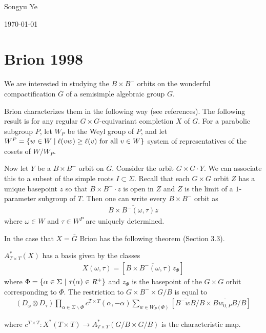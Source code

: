 \documentclass[12pt]{article}
\begin{document}
Songyu Ye

\today

\hfill

\section{Brion 1998}
We are interested in studying the $B\times B^-$ orbits on the wonderful compactification $\overline G$
of a semisimple algebraic group $G$.

\hfill

Brion characterizes them in the following way (see references). The following result is for
any regular $G\times G$-equivariant completion $X$ of $G$. For a parabolic subgroup $P$,
let $W_P$ be the Weyl group of $P$, and let 
$W^P = \{w\in W\mid \ell(vw)\geq \ell(v) \text{ for all } v\in W\}$ system of representatives 
of the cosets of $W/W_P$.

\hfill 

Now let $Y$ be a $B\times B^-$ orbit on $\overline G$. Consider the orbit $G\times G\cdot Y$. We can associate 
this to a subset of the simple roots $I\subset \Sigma$. Recall that each $G\times G$ orbit $Z$ has 
a unique basepoint $z$ so that $B\times B^-\cdot z$ is open in $Z$ and $Z$ is the limit of a $1$-parameter 
subgroup of $T$. Then one can write every $B\times B^-$ orbit as \begin{align*}
    \overline{B\times B^-(\omega,\tau)z}
\end{align*} where $\omega\in W$ and $\tau \in W^P$ are uniquely determined.

\hfill

In the case that $X = \bar G$ Brion has the following theorem (Section 3.3). 

\begin{theorem}
    $A_{T\times T}^*(X)$ has a basis given by the classes \begin{align*}
        X(\omega,\tau) = [\overline{B\times B^-(\omega,\tau)z_\Phi}]
    \end{align*} where $\Phi = \{\alpha\in\Sigma \ \vert \  \tau(\alpha)\in R^+\}$ and $z_\Phi$ is the basepoint of the $G\times G$ orbit corresponding
    to $\Phi$. The restriction to $G\times B^-\times G/B$ is equal to \begin{align*}
        (D_\omega \otimes D_\tau) \prod_{\alpha\in\Sigma\backslash\Phi}c^{T\times T}(\alpha,-\alpha)\sum_{w\in W_P(\Phi)}[\overline{B^-wB}/B\times \overline{Bw_{0,P}B}/B]
    \end{align*}
\end{theorem}
where $c^{T\times T}:X^*(T\times T)\to A_{T\times T}^*(G/B\times G/B)$ is the characteristic map.
\end{document}
